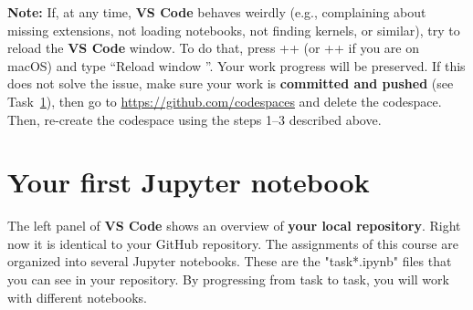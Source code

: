 \documentclass[12pt,a4paper]{article}
\begin{document}
\textbf{Note:} If, at any time, \textbf{VS Code} behaves weirdly (e.g., complaining about missing extensions, not loading notebooks, not finding kernels, or similar), try to reload the \textbf{VS Code} window. To do that, press \Ctrl+\keystroke{\shift}+ (or \keystroke{\cmd}+\keystroke{\shift}+ if you are on macOS) and type ``Reload window \Return''. Your work progress will be preserved. If this does not solve the issue, make sure your work is \textbf{committed and pushed} (see Task~\ref{task:notebooks}), then go to \url{https://github.com/codespaces} and delete the codespace. Then, re-create the codespace using the steps 1--3 described above.

\section{Your first Jupyter notebook}
\label{task:notebooks}
The left panel of \textbf{VS Code} shows an overview of \textbf{your local repository}. Right now it is identical to your GitHub repository. The assignments of this course are organized into several Jupyter notebooks. These are the "task*.ipynb" files that you can see in your repository. By progressing from task to task, you will work with different notebooks.
\end{document}
